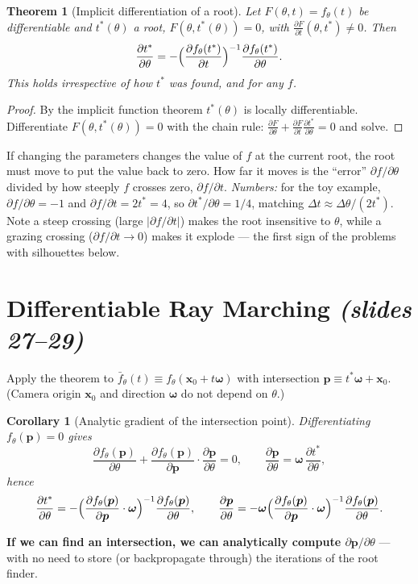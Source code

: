 \documentclass[11pt,a4paper]{article}
\newcommand{\bx}{\bm{x}}
\newcommand{\bp}{{\bm{p}}}
\newcommand{\bom}{{\bm{\omega}}}
\newcommand{\pdv}[2]{\frac{\partial #1}{\partial #2}}
\theoremstyle{definition}
\theoremstyle{plain}
\newtheorem{theorem}[definition]{Theorem}
\newtheorem{corollary}[definition]{Corollary}
\theoremstyle{remark}
\begin{document}
\begin{theorem}[Implicit differentiation of a root]\label{thm:implicitroot}
Let $F(\theta,t)=f_\theta(t)$ be differentiable and $t^*(\theta)$ a root, $F(\theta,t^*(\theta))=0$, with
$\pdv{F}{t}(\theta,t^*)\neq0$. Then
\[
\pdv{t^*}{\theta}=-\Bigl(\pdv{f_\theta(t^*)}{t}\Bigr)^{-1}\pdv{f_\theta(t^*)}{\theta}.
\]
This holds irrespective of how $t^*$ was found, and for any $f$.
\end{theorem}
\begin{proof}
By the implicit function theorem $t^*(\theta)$ is locally differentiable. Differentiate
$F(\theta,t^*(\theta))=0$ with the chain rule: $\pdv{F}{\theta}+\pdv{F}{t}\pdv{t^*}{\theta}=0$ and solve.
\end{proof}
\begin{intuition}
If changing the parameters changes the value of $f$ at the current root, the root must move to put the value back to
zero. How far it moves is the ``error'' $\partial f/\partial\theta$ divided by how steeply $f$ crosses zero,
$\partial f/\partial t$. \emph{Numbers:} for the toy example, $\partial f/\partial\theta=-1$ and $\partial f/\partial t=2t^*=4$,
so $\partial t^*/\partial\theta=1/4$, matching $\Delta t\approx\Delta\theta/(2t^*)$. Note a steep crossing
(large $|\partial f/\partial t|$) makes the root insensitive to $\theta$, while a grazing crossing
($\partial f/\partial t\to0$) makes it explode --- the first sign of the problems with silhouettes below.
\end{intuition}

\section{Differentiable Ray Marching \emph{(slides 27--29)}}
Apply the theorem to $\bar f_\theta(t)\equiv f_\theta(\bx_0+t\bom)$ with intersection $\bp\equiv t^*\bom+\bx_0$.
(Camera origin $\bx_0$ and direction $\bom$ do not depend on $\theta$.)

\begin{corollary}[Analytic gradient of the intersection point]\label{cor:dp}
Differentiating $f_\theta(\bp)=0$ gives
\[
\pdv{f_\theta(\bp)}{\theta}+\pdv{f_\theta(\bp)}{\bp}\cdot\pdv{\bp}{\theta}=0,
\qquad \pdv{\bp}{\theta}=\bom\,\pdv{t^*}{\theta},
\]
hence
\[
\pdv{t^*}{\theta}=-\Bigl(\pdv{f_\theta(\bp)}{\bp}\cdot\bom\Bigr)^{-1}\pdv{f_\theta(\bp)}{\theta},
\qquad
\pdv{\bp}{\theta}=-\bom\Bigl(\pdv{f_\theta(\bp)}{\bp}\cdot\bom\Bigr)^{-1}\pdv{f_\theta(\bp)}{\theta}.
\]
\end{corollary}
\textbf{If we can find an intersection, we can analytically compute $\partial\bp/\partial\theta$} --- with no need to store
(or backpropagate through) the iterations of the root finder.
\end{document}
